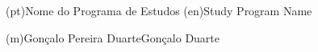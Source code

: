 \ntdegreename*(pt){Nome do Programa de Estudos}
\ntdegreename*(en){Study Program Name}




\ntauthorname(m){Gonçalo Pereira Duarte}{Gonçalo Duarte}

